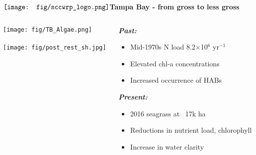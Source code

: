 \documentclass[serif]{beamer}\usepackage[]{graphicx}\usepackage[]{color}
\newcommand{\emtxt}[1]{\textbf{\textit{{\color{mypal4} #1}}}}
\begin{document}
\begin{frame}{{$\vcenter{\hbox{\texttt{[image: fig/sccwrp\_logo.png]}}}$\hspace{0.07in}\textbf{Tampa Bay - from gross to less gross}}}
\begin{columns}
\begin{column}{0.5\textwidth}
\onslide<+->
\begin{center}
\texttt{[image: fig/TB\_Algae.png]}\\~\\
\texttt{[image: fig/post\_rest\_sh.jpg]}\\~\\
\end{center}
\end{column}
\begin{column}{0.5\textwidth}
\emtxt{Past:}
\begin{itemize}
\item Mid-1970s N load 8.2$\times$10$^6$ yr$^{-1}$ {\footnotesize \cite{Greening06}}
\item Elevated chl-a concentrations
\item Increased occurrence of HABs
\end{itemize}
\onslide<+->
\emtxt{Present:}
\begin{itemize}
\item 2016 seagrass at ~17k ha {\footnotesize \cite{Sherwood17}}
\item Reductions in nutrient load, chlorophyll
\item Increase in water clarity {\footnotesize \cite{Morrison06,Beck17c}}
\end{itemize}
\end{column}
\end{columns}
\end{frame}
\end{document}

